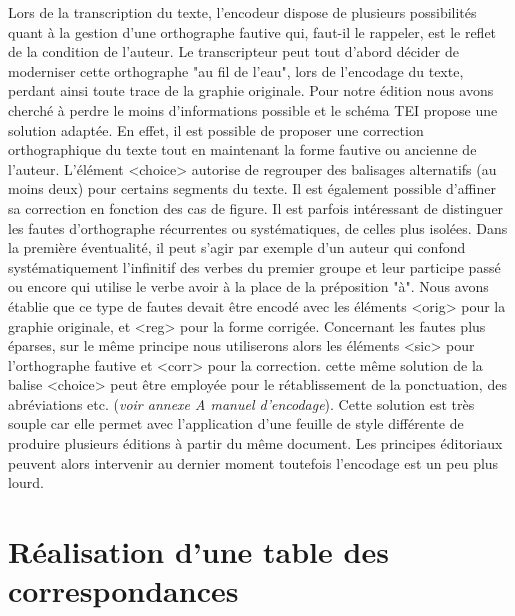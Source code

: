 \documentclass[12pt,a4paper]{book} %
\begin{document}
Lors de la transcription du texte, l'encodeur dispose de plusieurs possibilités quant à la gestion d'une orthographe fautive qui, faut-il le rappeler, est le reflet de la condition de l'auteur. Le transcripteur peut tout d'abord décider de moderniser cette orthographe "au fil de l'eau", lors de l'encodage du texte, perdant ainsi toute trace de la graphie originale. Pour notre édition nous avons cherché à perdre le moins d'informations possible et le schéma TEI propose une solution adaptée. En effet, il est possible de proposer une correction orthographique du texte tout en maintenant la forme fautive ou ancienne de l'auteur.
L'élément <choice> autorise de regrouper des balisages alternatifs (au moins deux) pour certains segments du texte. Il est également possible d'affiner sa correction en fonction des cas de figure. Il est parfois intéressant de distinguer les fautes d'orthographe récurrentes ou systématiques, de celles plus isolées. Dans la première éventualité, il peut s'agir par exemple d'un auteur qui confond systématiquement l'infinitif des verbes du premier groupe et leur participe passé ou encore qui utilise le verbe avoir à la place de la préposition "à". Nous avons établie que ce type de fautes devait être encodé avec les éléments <orig> pour la graphie originale, et <reg> pour la forme corrigée.
Concernant les fautes plus éparses, sur le même principe nous utiliserons alors les éléments <sic> pour l'orthographe fautive et <corr> pour la correction. cette même solution de la balise <choice> peut être employée pour le rétablissement de la ponctuation, des abréviations etc. (\textit{voir annexe A manuel d'encodage}).
Cette solution est très souple car elle permet avec l'application d'une feuille de style différente de produire plusieurs éditions à partir du même document. Les principes éditoriaux peuvent alors intervenir au dernier moment toutefois l'encodage est un peu plus lourd.

\section{Réalisation d'une table des correspondances}
\end{document}
